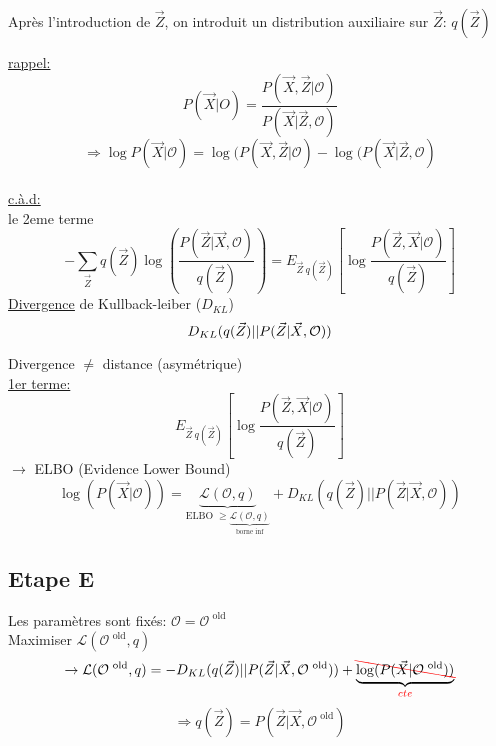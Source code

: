 \documentclass{article}
\newlength\tindent
\renewcommand{\indent}{\hspace*{\tindent}}
\newcommand{\tikzmark}[1]{\tikz[baseline,remember picture] \coordinate (#1) {};}
\newcommand{\Oapp}{\mathcal{O}}
\newcommand{\Lapp}{\mathcal{L}}
\begin{document}
\textbullet Après l'introduction de $\vec{Z}$, on introduit un distribution auxiliaire sur $\vec{Z}$: $q(\vec{Z})$
\vspace{1em}

\underline{rappel:} 
$$P(\vec{X}|O) = \frac{P(\vec{X},\vec{Z}|\Oapp)}{P(\vec{X}|\vec{Z},\Oapp)}$$
$$\Rightarrow \log P(\vec{X}|\Oapp) = \log(P(\vec{X},\vec{Z}|\Oapp) - \log(P(\vec{X}|\vec{Z},\Oapp)$$\\

\underline{c.à.d:}\\
\indent le 2eme terme
$$-\sum_{\vec{Z}}q(\vec{Z})\log\left( \frac{P(\vec{Z}|\vec{X},\Oapp)}{q(\vec{Z})} \right) = E_{\vec{Z}~q(\vec{Z})} \left[ \log \frac{P(\vec{Z},\vec{X}|\Oapp)}{q(\vec{Z})} \right]$$
\underline{\underline{Divergence}} de Kullback-leiber ($D_{KL}$)\\
$$D_{KL}(\tikzmark{q}q(\vec{Z})||\tikzmark{P}P(\vec{Z}|\vec{X},\Oapp))$$
\vspace{1em}

Divergence $\neq$ distance (asymétrique)\\

\underline{\textbullet 1er terme:}\\
$$E_{\vec{Z}~q(\vec{Z})} \left[ \log \frac{P(\vec{Z},\vec{X}|\Oapp)}{q(\vec{Z})} \right]$$
$\rightarrow$ ELBO (Evidence Lower Bound)\\
$$\log(P(\vec{X}|\Oapp)) = \underbrace{\Lapp(\Oapp,q)}_{\text{ELBO } \geq\underbrace{\Lapp(\Oapp,q)}_{\text{borne inf}}} + D_{KL}(q(\vec{Z})||P(\vec{Z}|\vec{X},\Oapp))$$

\subsection{Etape E}
\textbullet Les paramètres sont fixés: $\Oapp = \Oapp^{\text{ old}}$\\
\textbullet Maximiser $\Lapp(\Oapp^{\text{ old}},q)$
$$\rightarrow \Lapp(\Oapp^{\text{ old}},q) = - D_{KL}(q(\vec{Z})||P(\vec{Z}|\vec{X},\Oapp^{\text{ old}})) + \underbrace{\color{red}\bcancel{\color{black}\log(P(\vec{X}|\Oapp^{\text{ old}}))}}_{\color{red}cte}$$
$$\Rightarrow q(\vec{Z})=P(\vec{Z}|\vec{X},\Oapp^{\text{ old}})$$
\end{document}
